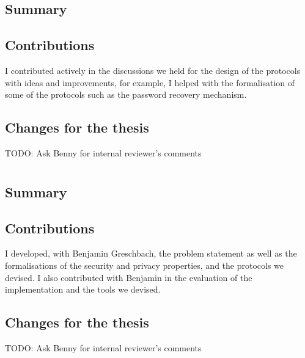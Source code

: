 \documentclass[showtrims, oldfontcommands]{kthesis}
\begin{document}
\subsection{Summary}


\subsection{Contributions}
    \label{subsection:contributions-p2p}
I contributed actively in the discussions we held for the design of the protocols 
with ideas and improvements, for example, I helped with the formalisation of some 
of the protocols such as the password recovery mechanism. 

\subsection{Changes for the thesis}
TODO: Ask Benny for internal reviewer's comments

\section{}
\begingroup\centering
\begin{ppBox}
\end{ppBox}
\endgroup

\subsection{Summary}

\subsection{Contributions}
I developed, with Benjamin Greschbach, the problem statement as well as the formalisations 
of the security and privacy properties, and the protocols we devised. I also contributed 
with Benjamin in the evaluation of the implementation and the tools we devised.

\subsection{Changes for the thesis}
TODO: Ask Benny for internal reviewer's comments
\end{document}
